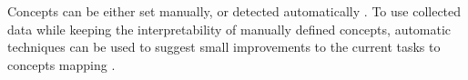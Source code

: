 %
%


Concepts can be either set manually, or detected automatically
\cite{niznan-thesis, rihak-phd}. %
To use collected data while keeping the interpretability of manually defined
concepts, automatic techniques can be used to suggest small improvements to the
current tasks to concepts mapping \cite[chapter 3]{its-domain-models}.






